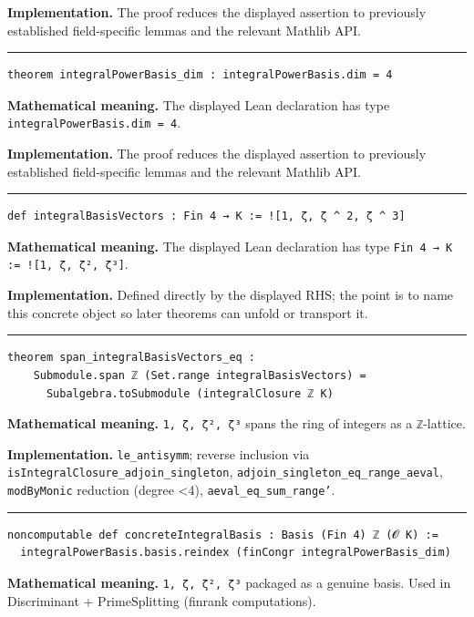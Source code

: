 \documentclass[UTF8,a4paper,11pt,fontset=fandol]{ctexart}
\theoremstyle{definition}
\newcommand{\statementsep}{\par\medskip\hrule\medskip}
\begin{document}
\noindent\textbf{Implementation.} The proof reduces the displayed assertion to previously established field-specific lemmas and the relevant Mathlib API.\par
\statementsep
\begin{verbatim}
theorem integralPowerBasis_dim : integralPowerBasis.dim = 4
\end{verbatim}
\noindent\textbf{Mathematical meaning.} The displayed Lean declaration has type \texttt{integralPowerBasis.\allowbreak{}dim = 4}.\par
\noindent\textbf{Implementation.} The proof reduces the displayed assertion to previously established field-specific lemmas and the relevant Mathlib API.\par
\statementsep
\begin{verbatim}
def integralBasisVectors : Fin 4 → K := ![1, ζ, ζ ^ 2, ζ ^ 3]
\end{verbatim}
\noindent\textbf{Mathematical meaning.} The displayed Lean declaration has type \texttt{Fin 4 → K := ![1, ζ, ζ², ζ³]}.\par
\noindent\textbf{Implementation.} Defined directly by the displayed RHS; the point is to name this concrete object so later theorems can unfold or transport it.\par
\statementsep
\begin{verbatim}
theorem span_integralBasisVectors_eq :
    Submodule.span ℤ (Set.range integralBasisVectors) =
      Subalgebra.toSubmodule (integralClosure ℤ K)
\end{verbatim}
\noindent\textbf{Mathematical meaning.} \texttt{1, ζ, ζ², ζ³} spans the ring of integers as a \texttt{ℤ}-lattice.\par
\noindent\textbf{Implementation.} \texttt{le\_\allowbreak{}antisymm}; reverse inclusion via \texttt{isIntegralClosure\_\allowbreak{}adjoin\_\allowbreak{}singleton}, \texttt{adjoin\_\allowbreak{}singleton\_\allowbreak{}eq\_\allowbreak{}range\_\allowbreak{}aeval}, \texttt{modByMonic} reduction (degree <4), \texttt{aeval\_\allowbreak{}eq\_\allowbreak{}sum\_\allowbreak{}range'}.\par
\statementsep
\begin{verbatim}
noncomputable def concreteIntegralBasis : Basis (Fin 4) ℤ (𝓞 K) :=
  integralPowerBasis.basis.reindex (finCongr integralPowerBasis_dim)
\end{verbatim}
\noindent\textbf{Mathematical meaning.} \texttt{1, ζ, ζ², ζ³} packaged as a genuine basis. Used in Discriminant + PrimeSplitting (finrank computations).\par
\end{document}
